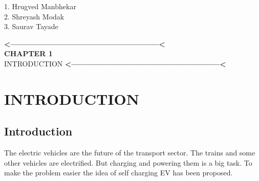 \documentclass[a4paper,12pt]{article}
\begin{document}
\vspace{4cm}
\begin{flushright}
1. Hrugved Manbhekar\\[1in]
2. Shreyash Modak\\[1in]
3. Saurav Tayade\\


\end{flushright}

\newpage
\tableofcontents
{}
\newpage
\listoffigures
{}




\newpage

\pagestyle{fancy}
\fancyhf{}
\fancyfoot[R]{\thepage}
\renewcommand{\footrulewidth}{1pt}


\newpage
\thispagestyle{empty}
\vspace*{0.25\textheight}
\begin{center}
\begin{center}
{\bfseries\LARGE <------------------------------------------------------<}\\
{\bfseries\LARGE CHAPTER 1}\\[2cm]


{\scshape\Huge INTRODUCTION}
{\bfseries\LARGE <------------------------------------------------------<}
\end{center}
\end{center}
\newpage

\section{INTRODUCTION}
\subsection{Introduction}
The electric vehicles are the future of the transport sector. The trains and some other vehicles are electrified. But charging and powering them is a big task. To make the problem easier the idea of self charging EV has been proposed. 
\end{document}
